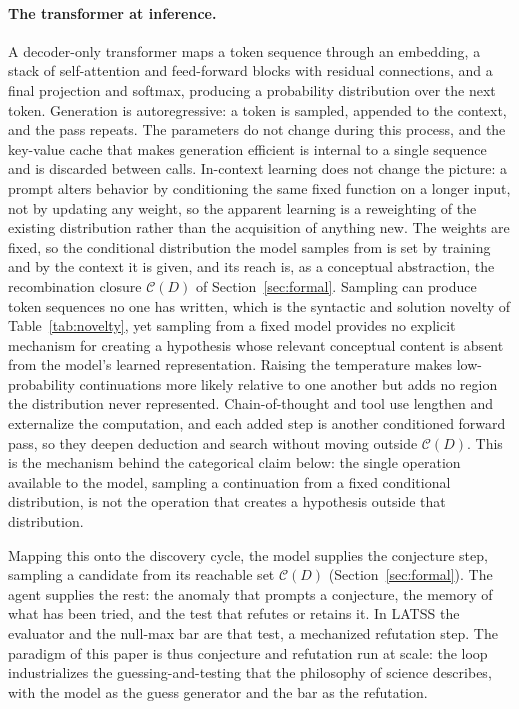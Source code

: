 \documentclass[11pt]{article}
\begin{document}
\paragraph{The transformer at inference.} A decoder-only transformer maps a token sequence through an
embedding, a stack of self-attention and feed-forward blocks with residual connections, and a final
projection and softmax, producing a probability distribution over the next token. Generation is
autoregressive: a token is sampled, appended to the context, and the pass repeats. The parameters do
not change during this process, and the key-value cache that makes generation efficient is internal to a
single sequence and is discarded between calls. In-context learning does not change the picture: a
prompt alters behavior by conditioning the same fixed function on a longer input, not by updating any
weight, so the apparent learning is a reweighting of the existing distribution rather than the
acquisition of anything new. The weights are fixed, so the conditional distribution the model samples
from is set by training and by the context it is given, and its reach is, as a conceptual abstraction,
the recombination closure $\mathcal{C}(D)$ of Section~\ref{sec:formal}. Sampling can produce token
sequences no one has written, which is the syntactic and solution novelty of Table~\ref{tab:novelty},
yet sampling from a fixed model provides no explicit mechanism for creating a hypothesis whose relevant
conceptual content is absent from the model's learned representation. Raising the temperature makes
low-probability continuations more likely relative to one another but adds no region the distribution
never represented. Chain-of-thought
and tool use lengthen and externalize the computation, and each added step is another conditioned
forward pass, so they deepen deduction and search without moving outside $\mathcal{C}(D)$. This is the
mechanism behind the categorical claim below: the single operation available to the model, sampling a
continuation from a fixed conditional distribution, is not the operation that creates a hypothesis
outside that distribution.

Mapping this onto the discovery cycle, the model supplies the conjecture step, sampling a candidate
from its reachable set $\mathcal{C}(D)$ (Section~\ref{sec:formal}). The agent supplies the rest: the
anomaly that prompts a conjecture, the memory of what has been tried, and the test that refutes or
retains it. In LATSS the evaluator and the null-max bar are that test, a mechanized refutation step.
The paradigm of this paper is thus conjecture and refutation run at scale: the loop industrializes the
guessing-and-testing that the philosophy of science describes, with the model as the guess generator
and the bar as the refutation.
\end{document}
